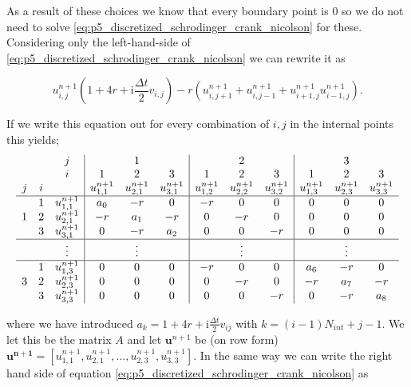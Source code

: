\documentclass[../main_proj5.tex]{subfiles}
\begin{document}
\noindent As a result of these choices we know that every boundary point is $0$ so we do not need to solve \eqref{eq:p5_discretized_schrodinger_crank_nicolson} for these. Considering only the left-hand-side of \eqref{eq:p5_discretized_schrodinger_crank_nicolson} we can rewrite it as

\begin{equation*}
    u_{i,j}^{n+1}(1 + 4r + \text{i} \frac{\Delta t}{2} v_{i,j}) 
    - r(u_{i,j+1}^{n+1} +u_{i,j-1}^{n+1} + u_{i+1,j}^{n+1} u_{i-1,j}^{n+1}) .
\end{equation*}

\noindent If we write this equation out for every combination of $i,j$ in the internal points this yields;
$$
\begin{array}{ccc|ccc|ccc|ccc}
&     & j       &    & 1 &                    &    & 2 &                     &   & 3 &                       \\
&     & i       &  1 & 2 & 3                  &  1 & 2 & 3                   & 1 & 2 & 3                    \\
j & i &         & u_{1,1}^{n+1} & u_{2,1}^{n+1} & u_{3,1}^{n+1} &  u_{1,2}^{n+1} & u_{2,2}^{n+1} & u_{3,2}^{n+1} & u_{1,3}^{n+1} & u_{2,3}^{n+1} & u_{3,3}^{n+1}  \\ \hline
  & 1 & u_{1,1}^{n+1} &  a_{0} & -r & 0 & -r & 0 & 0  & 0 & 0 & 0 \\
1 & 2 & u_{2,1}^{n+1} &  -r & a_{1} & -r &  0 & -r & 0 & 0 & 0 & 0  \\
  & 3 & u_{3,1}^{n+1} &  0 & -r & a_2 &  0 & 0 & -r &  0 & 0 & 0  \\ \hline
& & \vdots & &  \vdots &&& \vdots &&&  \vdots &  \\ \hline
&   1 & u_{1,3}^{n+1} & 0 & 0 & 0 & -r & 0 & 0 &  a_{6} & -r & 0  \\
3 & 2 & u_{2,3}^{n+1} & 0 & 0 & 0 & 0 & -r & 0 &  -r & a_7 & -r \\
&   3 & u_{3,3}^{n+1} & 0 & 0 & 0 & 0 & 0 & -r &  0 & -r & a_8  \\ 
\end{array} 
$$

\noindent where we have introduced $a_k = 1 + 4r + \text{i} \frac{\Delta t}{2} v_{ij}$ with $k=(i-1)N_{int} + j - 1$. We let this be the matrix $A$ and let $\mathbf{u}^{n+1}$ be (on row form) $\mathbf{u^{n+1}} = [u_{1,1}^{n+1}, u_{2,1}^{n+1}, ..., u_{2,3}^{n+1}, u_{3,3}^{n+1}]$. In the same way we can write the right hand side of equation \eqref{eq:p5_discretized_schrodinger_crank_nicolson} as 
\end{document}

